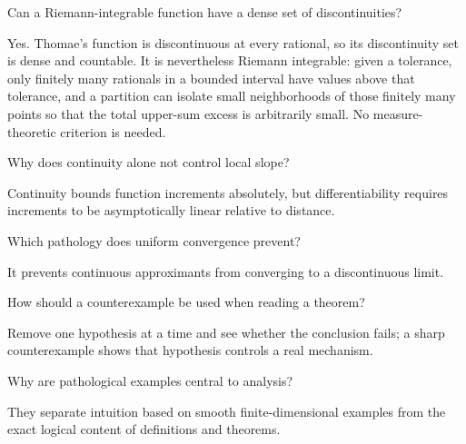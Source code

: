 \begin{problem}\label{prob:ii15-problem-08}
Can a Riemann-integrable function have a dense set of discontinuities?
\end{problem}
\begin{solution}
Yes. Thomae's function is discontinuous at every rational, so its discontinuity set is dense and countable. It is nevertheless Riemann integrable: given a tolerance, only finitely many rationals in a bounded interval have values above that tolerance, and a partition can isolate small neighborhoods of those finitely many points so that the total upper-sum excess is arbitrarily small. No measure-theoretic criterion is needed.
\end{solution}

\begin{problem}\label{prob:ii15-problem-09}
Why does continuity alone not control local slope?
\end{problem}
\begin{solution}
Continuity bounds function increments absolutely, but differentiability requires increments to be asymptotically linear relative to distance.
\end{solution}

\begin{problem}\label{prob:ii15-problem-10}
Which pathology does uniform convergence prevent?
\end{problem}
\begin{solution}
It prevents continuous approximants from converging to a discontinuous limit.
\end{solution}

\begin{problem}\label{prob:ii15-problem-11}
How should a counterexample be used when reading a theorem?
\end{problem}
\begin{solution}
Remove one hypothesis at a time and see whether the conclusion fails; a sharp counterexample shows that hypothesis controls a real mechanism.
\end{solution}

\begin{problem}\label{prob:ii15-problem-12}
Why are pathological examples central to analysis?
\end{problem}
\begin{solution}
They separate intuition based on smooth finite-dimensional examples from the exact logical content of definitions and theorems.
\end{solution}


